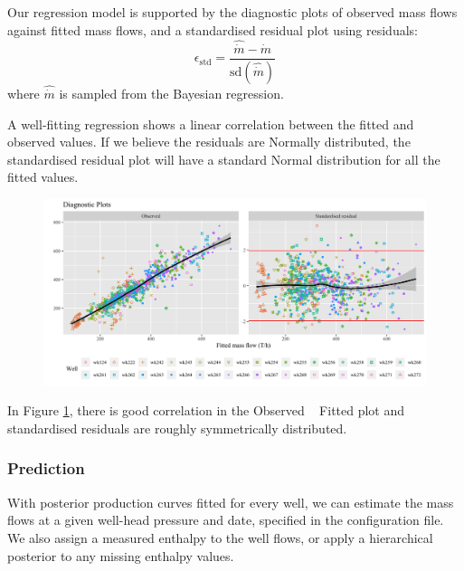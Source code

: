 \documentclass[a4paper, 12pt]{article}
\begin{document}
Our regression model is supported by the diagnostic plots of observed mass flows against fitted mass flows, and a standardised residual plot using residuals:
\begin{equation}
\epsilon_\text{std} = \frac{\hat{\dot{m}} - \dot{m}}{\text{sd}\left( \hat{\dot{m}} \right)}
\end{equation}
where $\hat{\dot{m}}$ is sampled from the Bayesian regression.

A well-fitting regression shows a linear correlation between the fitted and observed values. If we believe the residuals are Normally distributed, the standardised residual plot will have a standard Normal distribution for all the fitted values. 

\begin{figure}
\centering
  \includegraphics[width=\linewidth]{media/diagnostics}
  \label{fig:diagnostics}
\end{figure}

In Figure \ref{fig:diagnostics}, there is good correlation in the Observed ~ Fitted plot and standardised residuals are roughly symmetrically distributed. %

\subsubsection{Prediction}
With posterior production curves fitted for every well, we can estimate the mass flows at a given well-head pressure and date, specified in the configuration file. We also assign a measured enthalpy to the well flows, or apply a hierarchical posterior to any missing enthalpy values.
\end{document}
